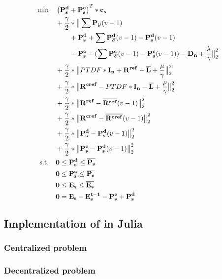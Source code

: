  \begin{subequations}
	\begin{align}
		 \min \quad & \left(\vb{P_s^d} + \vb{P_s^c}\right)^T * \vb{c_s}\\
		 & + \frac{\gamma}{2} * \big\| \sum \vb{P_\mathcal{G}}(v-1) \nonumber \\ 
		 & \qquad + \vb{P_s^d} + \sum \vb{P_\mathcal{S}^d}(v-1) - \vb{P_s^d}(v-1) \nonumber \\
		 & \qquad - \vb{P_s^c} - (\sum \vb{P_\mathcal{S}^c}(v-1) -  \vb{P_s^c}(v-1)) - \vb{D_n} + \frac{\vb{\lambda}}{\gamma} \big\|^2_2 \nonumber \\
		 & + \frac{\gamma}{2} * \big\| PTDF * \vb{I_n} + \vb{R^{ref}} - \vb{\overline{L}} + \frac{\vb{\mu}}{\gamma}\big\|^2_2 \nonumber \\
		 & + \frac{\gamma}{2} * \big\| \vb{R^{cref}} - PTDF * \vb{I_n} - \vb{\overline{L}} + \frac{\vb{\rho}}{\gamma}\big\|^2_2 \nonumber \\
		 & + \frac{\gamma}{2} * \big\| \vb{R^{ref}} - \vb{\overline{R^{ref}}}(v-1)  \big\|^2_2 \nonumber\\
		 & + \frac{\gamma}{2} * \big\| \vb{R^{cref}} - \vb{\overline{R^{cref}}}(v-1) \big\|^2_2 \nonumber \\
		 & + \frac{\gamma}{2} * \big\| \vb{P_s^d} - \vb{P_s^d}(v-1)\big\|^2_2 \nonumber \\
		 & + \frac{\gamma}{2} * \big\| \vb{P_s^c} - \vb{P_s^d}(v-1)\big\|^2_2 \nonumber \\
		 \text{s.t.} \quad & \vb{0} \leq \vb{P_s^d} \leq \vb{\overline{P_s}} \\
		 & \vb{0} \leq \vb{P_s^c} \leq \vb{\overline{P_s}} \\
		 & \vb{0} \leq \vb{E_s} \leq \vb{\overline{E_s}}\\
		 & \vb{0} = \vb{E_s} - \vb{E_s^{t-1}} - \vb{P_s^c} + \vb{P_s^d}
	\end{align}
\end{subequations}


\subsection{Implementation of in Julia}

\subsubsection{Centralized problem}

\subsubsection{Decentralized problem}
